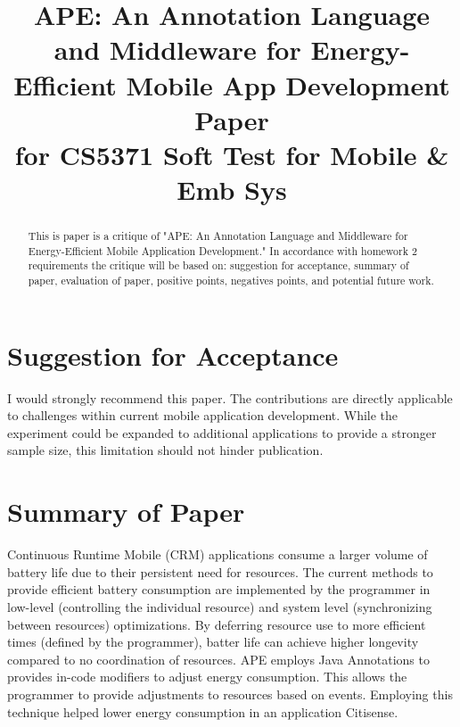 \documentclass[conference]{IEEEtran}
\begin{document}
\title{APE: An Annotation Language and Middleware for Energy-Efficient Mobile App Development Paper\\
for CS5371 Soft Test for Mobile \& Emb Sys}

\author{
}

\maketitle

\begin{abstract}
This is paper is a critique of "APE: An Annotation Language and Middleware for Energy-Efficient Mobile Application Development." In accordance with homework 2 requirements the critique will be based on: suggestion for acceptance, summary of paper, evaluation of paper, positive points, negatives points, and potential future work. 
\end{abstract}

\IEEEpeerreviewmaketitle

\section{Suggestion for Acceptance}
I would strongly recommend this paper. The contributions are directly applicable to challenges within current mobile application development. While the experiment could be expanded to additional applications to provide a stronger sample size, this limitation should not hinder publication.

\section{Summary of Paper}
Continuous Runtime Mobile (CRM) applications consume a larger volume of battery life due to their persistent need for resources. The current methods to provide efficient battery consumption are implemented by the programmer in low-level (controlling the individual resource) and system level (synchronizing between resources) optimizations. By deferring resource use to more efficient times (defined by the programmer), batter life can  achieve higher longevity compared to no coordination of resources. APE employs Java Annotations to provides in-code modifiers to adjust energy consumption. This allows the programmer to provide adjustments to resources based on events. Employing this technique helped lower energy consumption in an application Citisense. 
\end{document}
